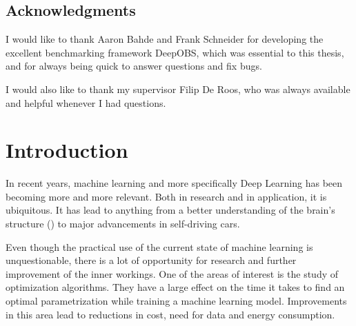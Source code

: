 \documentclass[twoside,12pt,a4paper]{report}
\begin{document}
\newpage
\section*{Acknowledgments}
I would like to thank Aaron Bahde and Frank Schneider for developing the excellent benchmarking framework DeepOBS, which was essential to this thesis, and for always being quick to answer questions and fix bugs.

I would also like to thank my supervisor Filip De Roos, who was always available and helpful whenever I had questions.
\cleardoublepage


\renewcommand{\baselinestretch}{1.3}
\small\normalsize

\tableofcontents

\renewcommand{\baselinestretch}{1}
\small\normalsize

\cleardoublepage


\setcounter{page}{1}


\chapter{Introduction} %
In recent years, machine learning and more specifically Deep Learning has been becoming more and more relevant. Both in research and in application, it is ubiquitous. It has lead to anything from a better understanding of the brain's structure (\cite{brown2016machine}) to major advancements in self-driving cars.

Even though the practical use of the current state of machine learning is unquestionable, there is a lot of opportunity for research and further improvement of the inner workings. One of the areas of interest is the study of optimization algorithms. They have a large effect on the time it takes to find an optimal parametrization while training a machine learning model. Improvements in this area lead to reductions in cost, need for data and energy consumption.
\end{document}
